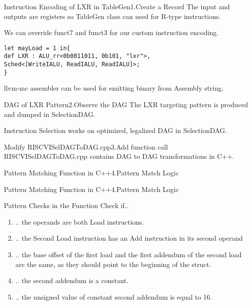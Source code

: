 \begin{frame}[fragile]{Instruction Encoding of LXR in TableGen}{1.Create a Record}
The input and outputs are registers so TableGen class can used for R-type instructions.

We can override funct7 and funct3 for our custom instruction encoding.
\begin{lstlisting}
let mayLoad = 1 in{
def LXR : ALU_rr<0b0011011, 0b101, "lxr">,
Sched<[WriteIALU, ReadIALU, ReadIALU]>;
}
\end{lstlisting}
llvm-mc assembler can be used for emitting binary from Assembly string.
\end{frame}

\begin{frame}[fragile]{DAG of LXR Pattern}{2.Observe the DAG}
The LXR targeting pattern is produced and dumped in SelectionDAG.

Instruction Selection works on optimized, legalized DAG in SelectionDAG.
\end{frame}

\begin{frame}[fragile]{Modify RISCVISelDAGToDAG.cpp}{3.Add function call}
    RISCVISelDAGToDAG.cpp contains DAG to DAG transformations in C++.

\end{frame}


\begin{frame}[fragile]{Pattern Matching Function in C++}{4.Pattern Match Logic}

\end{frame}

\begin{frame}[fragile]{Pattern Matching Function in C++}{4.Pattern Match Logic}

\end{frame}

\begin{frame}{Pattern Checks in the Function}
Check if..
\begin{enumerate}
    \item .. the operands are both Load instructions.
    \item .. the Second Load instruction has an Add instruction in its second operand
    \item .. the base offset of the first load and the first addendum of the second load are the same, as they should point to the beginning of the struct.
    \item .. the second addendum is a constant.
    \item .. the unsigned value of constant second addendum is equal to 16.
\end{enumerate}
\end{frame}

